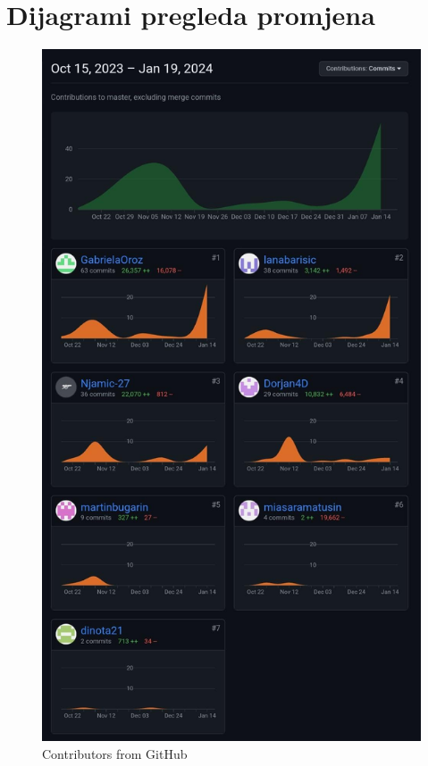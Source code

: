 					
		\eject
		\section*{Dijagrami pregleda promjena}
		
		
		\begin{figure}[H]
			\includegraphics[scale=0.32]{slike/contributors.JPEG} %
			\centering
			\caption{Contributors from GitHub}
			\label{fig:contributors} %
		\end{figure}
		
